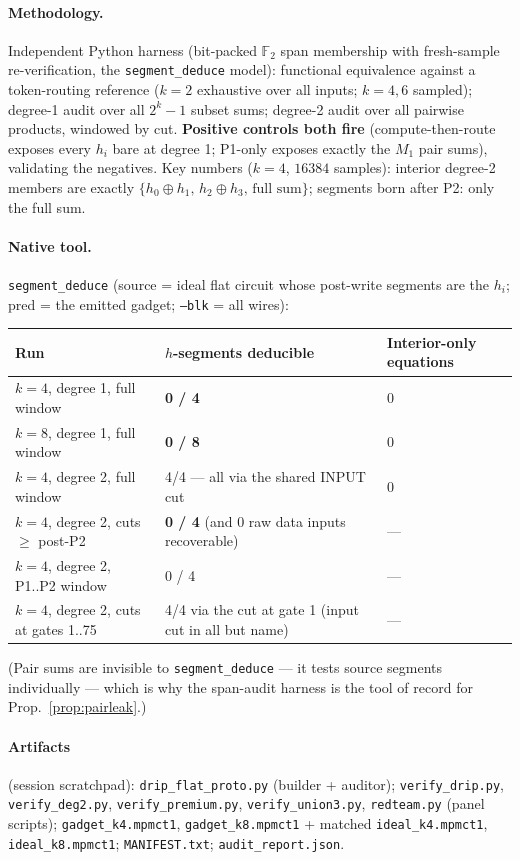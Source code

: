 \documentclass[11pt]{article}
\theoremstyle{remark}
\newcommand{\F}{\mathbb{F}_2}
\begin{document}
\paragraph{Methodology.} Independent Python harness (bit-packed $\F$ span membership with
fresh-sample re-verification, the \texttt{segment\_deduce} model): functional equivalence
against a token-routing reference ($k=2$ exhaustive over all inputs; $k=4,6$ sampled); degree-1
audit over all $2^k-1$ subset sums; degree-2 audit over all pairwise products, windowed by cut.
\textbf{Positive controls both fire} (compute-then-route exposes every $h_i$ bare at degree 1;
P1-only exposes exactly the $M_1$ pair sums), validating the negatives. Key numbers ($k=4$,
$16384$ samples): interior degree-2 members are exactly $\{h_0\oplus h_1,\,h_2\oplus
h_3,\,\text{full sum}\}$; segments born after P2: only the full sum.

\paragraph{Native tool.} \texttt{segment\_deduce} (source = ideal flat circuit whose post-write
segments are the $h_i$; pred = the emitted gadget; \texttt{--blk} = all wires):

\begin{center}
\small
\begin{tabular}{lll}
\toprule
Run & $h$-segments deducible & Interior-only equations\\
\midrule
$k=4$, degree 1, full window & \textbf{0 / 4} & 0\\
$k=8$, degree 1, full window & \textbf{0 / 8} & 0\\
$k=4$, degree 2, full window & 4/4 --- all via the shared INPUT cut & 0\\
$k=4$, degree 2, cuts $\ge$ post-P2 & \textbf{0 / 4} (and $0$ raw data inputs recoverable) & ---\\
$k=4$, degree 2, P1..P2 window & 0 / 4 & ---\\
$k=4$, degree 2, cuts at gates 1..75 & 4/4 via the cut at gate 1 (input cut in all but name) & ---\\
\bottomrule
\end{tabular}
\end{center}

(Pair sums are invisible to \texttt{segment\_deduce} --- it tests source segments individually
--- which is why the span-audit harness is the tool of record for
Prop.~\ref{prop:pairleak}.)

\paragraph{Artifacts} (session scratchpad): \texttt{drip\_flat\_proto.py} (builder + auditor);
\texttt{verify\_drip.py}, \texttt{verify\_deg2.py}, \texttt{verify\_premium.py},
\texttt{verify\_union3.py}, \texttt{redteam.py} (panel scripts);
\texttt{gadget\_k4.mpmct1}, \texttt{gadget\_k8.mpmct1} + matched \texttt{ideal\_k4.mpmct1},
\texttt{ideal\_k8.mpmct1};
\texttt{MANIFEST.txt}; \texttt{audit\_report.json}.
\end{document}
